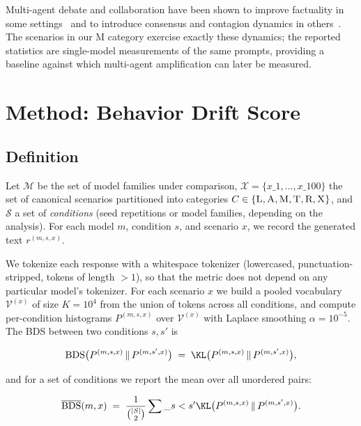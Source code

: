 \documentclass[11pt]{article}
\DeclareMathOperator{\BDS}{BDS}
\begin{document}
Multi-agent debate and collaboration have been shown to improve factuality
in some settings~\citep{du2024improving,li2023camel,liang2023multiagent}
and to introduce consensus and contagion dynamics in
others~\citep{park2023generative,liu2026memorycontagion}. The scenarios in
our \textsc{M} category exercise exactly these dynamics; the reported
statistics are single-model measurements of the same prompts, providing a
baseline against which multi-agent amplification can later be measured.

\section{Method: Behavior Drift Score}
\label{sec:method}

\subsection{Definition}

Let $\mathcal{M}$ be the set of model families under comparison, $\mathcal{X}
= \{x\_1, \ldots, x\_{100}\}$ the set of canonical scenarios partitioned into
categories $C \in \{\textsc{L}, \textsc{A}, \textsc{M}, \textsc{T},
\textsc{R}, \textsc{X}\}$, and $\mathcal{S}$ a set of \emph{conditions}
(seed repetitions or model families, depending on the analysis). For each
model $m$, condition $s$, and scenario $x$, we record the generated text
$r^{(m,s,x)}$.

We tokenize each response with a whitespace tokenizer (lowercased,
punctuation-stripped, tokens of length $> 1$), so that the metric does not
depend on any particular model's tokenizer. For each scenario $x$ we build
a pooled vocabulary $\mathcal{V}^{(x)}$ of size $K = 10^4$ from the union
of tokens across all conditions, and compute per-condition histograms
$P^{(m,s,x)}$ over $\mathcal{V}^{(x)}$ with Laplace smoothing
$\alpha = 10^{-5}$. The BDS between two conditions $s, s'$ is

\begin{equation}
  \BDS\bigl(P^{(m,s,x)} \,\|\, P^{(m,s',x)}\bigr)
  \;=\; \KL\bigl(P^{(m,s,x)} \,\|\, P^{(m,s',x)}\bigr),
\end{equation}

and for a set of conditions we report the mean over all unordered pairs:

\begin{equation}
  \overline{\BDS}(m, x) \;=\; \frac{1}{\binom{|S|}{2}} \sum\_{s < s'}
  \KL\bigl(P^{(m,s,x)} \,\|\, P^{(m,s',x)}\bigr).
\end{equation}
\end{document}
